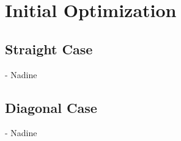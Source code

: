 \section{Initial Optimization}
\subsection{Straight Case}
- Nadine
\subsection{Diagonal Case}
- Nadine
